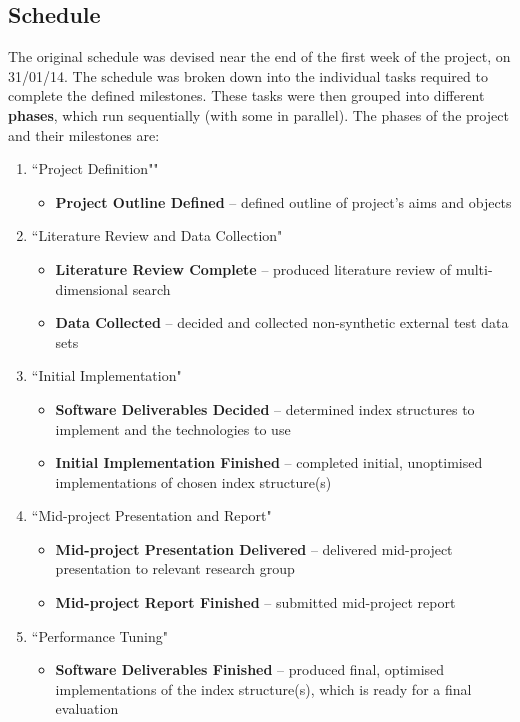 \subsection{Schedule}
\label{sec:schedule}

The original schedule was devised near the end of the first week of the project, on 31/01/14. The schedule was broken down into the individual tasks required to complete the defined milestones. These tasks were then grouped into different \textbf{phases}, which run sequentially (with some in parallel). The phases of the project and their milestones are:
\begin{enumerate}
	\item ``Project Definition""
	\begin{itemize}
		\item \textbf{Project Outline Defined} -- defined outline of project's aims and objects
	\end{itemize}
	\item ``Literature Review and Data Collection"
	\begin{itemize}	
		\item \textbf{Literature Review Complete} -- produced literature review of multi-dimensional search
		\item \textbf{Data Collected} --  decided and collected non-synthetic external test data sets
	\end{itemize}
	\item ``Initial Implementation"
	\begin{itemize}	
		\item \textbf{Software Deliverables Decided} -- determined index structures to implement and the technologies to use
		\item \textbf{Initial Implementation Finished} -- completed initial, unoptimised implementations of chosen index structure(s)
	\end{itemize}
	\item ``Mid-project Presentation and Report"
	\begin{itemize}	
		\item \textbf{Mid-project Presentation Delivered} -- delivered mid-project presentation to relevant research group
		\item \textbf{Mid-project Report Finished} -- submitted mid-project report
	\end{itemize}	
	\item ``Performance Tuning"
	\begin{itemize}
		\item \textbf{Software Deliverables Finished} -- produced final, optimised implementations of the index structure(s), which is ready for a final evaluation

\end{itemize}
\end{enumerate}
